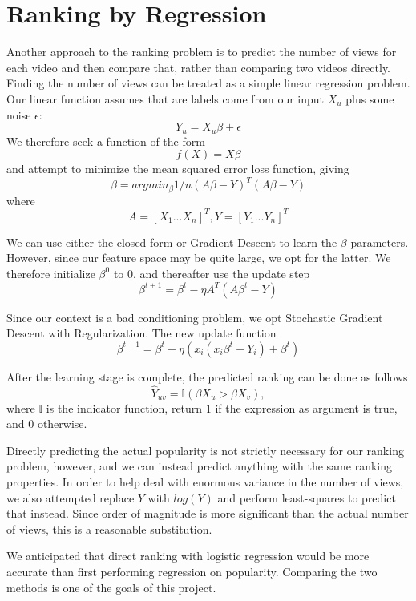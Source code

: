 \section{Ranking by Regression}
\label{sec:regression}
Another approach to the ranking problem is to predict the number of views for each video and then compare that, rather than comparing two videos directly. Finding the number of views can be treated as a simple linear regression problem. Our linear function assumes that are labels come from our input $X_u$ plus some noise $\epsilon$:
\begin{equation}
Y_u = X_u \beta + \epsilon
\end{equation}
We therefore seek a function of the form
\begin{equation}
f(X) = X \beta
\end{equation}
and attempt to minimize the mean squared error loss function, giving
\begin{equation}
\beta = arg min_\beta 1/n (A \beta - Y)^T(A \beta - Y)
\end{equation}
where
\begin{equation}
A = [X_1 ... X_n]^T, Y = [Y_1 ... Y_n]^T
\end{equation}
  
We can use either the closed form or Gradient Descent to learn the $\beta$ parameters.  However, since our feature space may be quite large, we opt for the latter.  We therefore initialize $\beta^0$ to 0, and thereafter use the update step
\begin{equation}
\beta^{t+1} = \beta^t - \eta A^T (A \beta^t - Y)
\end{equation}
 
Since our context is a bad conditioning problem, we opt Stochastic Gradient Descent with Regularization. The new update function
	\begin{equation}
		\beta^{t+1} = \beta^t - \eta (x_i (x_i\beta^t - Y_i) + \beta^t)
	\end{equation}

After the learning stage is complete, the predicted ranking can be done as follows
\begin{equation}
\hat{Y}_{uv} = \mathbb{I}(\beta X_u > \beta X_v),
\end{equation}
where $\mathbb{I}$ is the indicator function, return 1 if the expression as argument is true, and 0 otherwise.

Directly predicting the actual popularity is not strictly necessary for our ranking problem, however, and we can instead predict anything with the same ranking properties.  In order to help deal with enormous variance in the number of views, we also attempted replace $Y$ with $log(Y)$ and perform least-squares to predict that instead.  Since order of magnitude is more significant than the actual number of views, this is a reasonable substitution.

We anticipated that direct ranking with logistic regression would be more accurate than first performing regression on popularity.  Comparing the two methods is one of the goals of this project.
